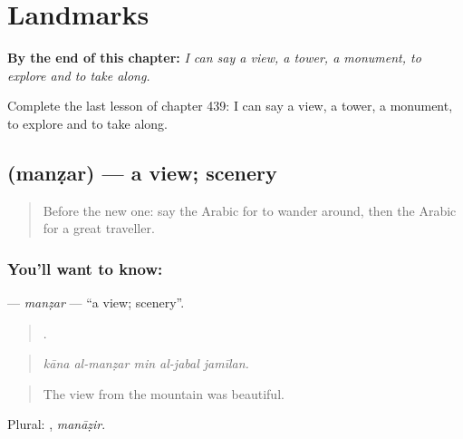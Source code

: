 
\chapter{Landmarks}
\label{ch:ar-landmarks}

\begin{chapteropening}
\textbf{By the end of this chapter:} \emph{I can say a view, a tower, a monument, to explore and to take along.}

Complete the last lesson of chapter 439: I can say a view, a tower, a monument, to explore and to take along.
\end{chapteropening}

\section[\texorpdfstring{\ar{منظر} (manẓar)}{منظر (manẓar)}]{ (manẓar) — a view; scenery}

\label{lesson:AR-C439-manzar}



\begin{quote}
Before the new one: say the Arabic for to wander around, then the Arabic for a great traveller.
\end{quote}

\subsection*{You'll want to know: }
\textbf{} — \emph{manẓar} — \textquotedblleft{}a view; scenery\textquotedblright{}.

\begin{quote}
    .
\end{quote}

\begin{quote}
\emph{kāna al-manẓar min al-jabal jamīlan.}
\end{quote}

\begin{quote}
The view from the mountain was beautiful.
\end{quote}

Plural: , \emph{manāẓir}.

